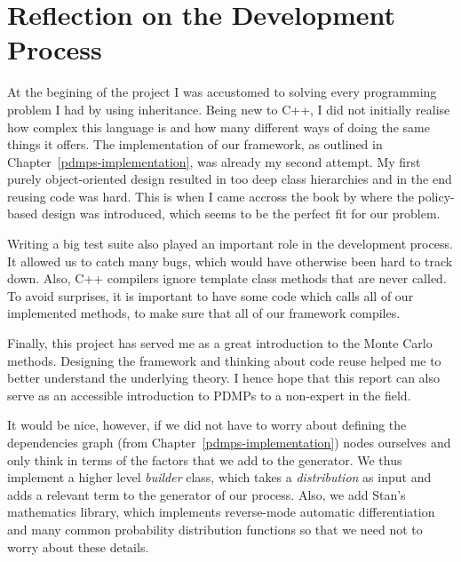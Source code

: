 \documentclass[report.tex]{subfiles}
\begin{document}
\section{Reflection on the Development Process}

At the begining of the project I was accustomed to solving every programming problem I had
by using inheritance.
Being new to C++, I did not initially realise how complex this language is and
how many different ways of doing the same things it offers.
The implementation of our framework, as outlined in Chapter~\ref{pdmps-implementation},
was already my second attempt.
My first purely object-oriented design resulted in too deep class hierarchies
and in the end reusing code was hard.
This is when I came accross the book by \citet{alexandrescu2001modern}
where the policy-based design was introduced, which seems to be the perfect
fit for our problem.

Writing a big test suite also played an important role in the development process.
It allowed us to catch many bugs, which would have otherwise been hard to track down.
Also, C++ compilers ignore template class methods that are never called.
To avoid surprises, it is important to have some code which calls all of our implemented
methods, to make sure that all of our framework compiles.

Finally, this project has served me as a great introduction to the Monte Carlo methods.
Designing the framework and thinking about code reuse helped me to better understand
the underlying theory.
I hence hope that this report can also serve as an accessible introduction to
PDMPs to a non-expert in the field.

It would be nice, however, if we did not have to worry about defining the dependencies
graph (from Chapter~\ref{pdmps-implementation}) nodes ourselves and only think in
terms of the factors that we add to the generator.
We thus implement a higher level \textit{builder} class, which takes a \textit{distribution}
as input and adds a relevant term to the generator of our process.
Also, we add Stan's mathematics library, which implements reverse-mode automatic differentiation
and many common probability distribution functions so that we need not to worry about these
details.
\end{document}
